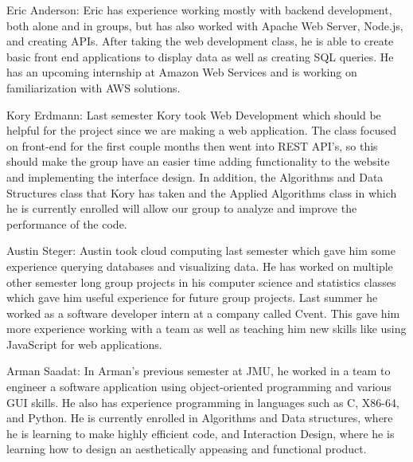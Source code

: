 \documentclass[11pt]{article}
\begin{document}
Eric Anderson: Eric has experience working mostly with backend development, both alone and in groups, but has also worked with Apache Web Server, Node.js, and creating APIs. After taking the web development class, he is able to create basic front end applications to display data as well as creating SQL queries. He has an upcoming internship at Amazon Web Services and is working on familiarization with AWS solutions.

Kory Erdmann: Last semester Kory took Web Development which should be helpful for the project since we are making a web application. The class focused on front-end for the first couple months then went into REST API's, so this should make the group have an easier time adding functionality to the website and implementing the interface design. In addition, the Algorithms and Data Structures class that Kory has taken and the Applied Algorithms class in which he is currently enrolled will allow our group to analyze and improve the performance of the code. 

Austin Steger: Austin took cloud computing last semester which gave him some experience querying databases and visualizing data. He has worked on multiple other semester long group projects in his computer science and statistics classes which gave him useful experience for future group projects. Last summer he worked as a software developer intern at a company called Cvent. This gave him more experience working with a team as well as teaching him new skills like using JavaScript for web applications.

Arman Saadat: In Arman's previous semester at JMU, he worked in a team to engineer a software application using object-oriented programming and various GUI skills. He also has experience programming in languages such as C, X86-64, and Python. He is currently enrolled in Algorithms and Data structures, where he is learning to make highly efficient code, and Interaction Design, where he is learning how to design an aesthetically appeasing and functional product.






\end{document}

